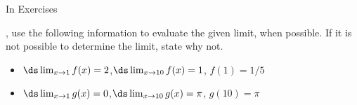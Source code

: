 {In Exercises%
%
%
}
{, use the following information to evaluate the given limit, when possible. If it is not possible to determine the limit, state why not.
\begin{itemize}
	\item $\ds \lim_{x\to1}f(x) = 2$,\quad $\ds \lim_{x\to10} f(x) = 1$, \quad $f(1)=1/5$
	\item $\ds \lim_{x\to1}g(x) = 0$,\quad $\ds \lim_{x\to10} g(x) = \pi$, \quad $g(10)=\pi$
\end{itemize}
}
